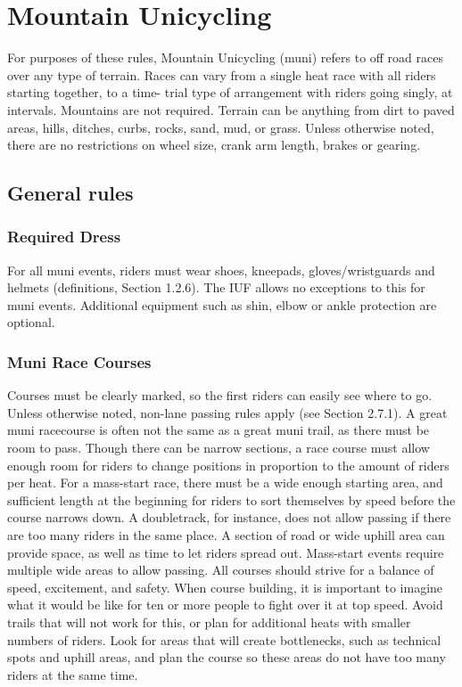 \chapter{Mountain Unicycling}

For purposes of these rules, Mountain Unicycling (muni) refers to off road races
over any type of terrain. Races can vary from a single heat race with all riders
starting together, to a time- trial type of arrangement with riders going
singly, at intervals. Mountains are not required. Terrain can be anything from
dirt to paved areas, hills, ditches, curbs, rocks, sand, mud, or grass. Unless
otherwise noted, there are no restrictions on wheel size, crank arm length,
brakes or gearing.


\section{General rules}


\subsection{Required Dress}
For all muni events, riders must wear shoes, kneepads, gloves/wristguards and
helmets (definitions, Section 1.2.6). %
The IUF allows no exceptions to this for muni events. Additional equipment such
as shin, elbow or ankle protection are optional.

\subsection{Muni Race Courses}
Courses must be clearly marked, so the first riders can easily see where to go.
Unless otherwise noted, non-lane passing rules apply (see Section 2.7.1).
A great muni racecourse is often not the same as a great muni
trail, as there must be room to pass. Though there can be narrow sections, a
race course must allow enough room for riders to change positions in proportion
to the amount of riders per heat. For a mass-start race, there must be a wide
enough starting area, and sufficient length at the beginning for riders to sort
themselves by speed before the course narrows down. A doubletrack, for instance,
does not allow passing if there are too many riders in the same place. A section
of road or wide uphill area can provide space, as well as time to let riders
spread out. Mass-start events require multiple wide areas to allow passing. All
courses should strive for a balance of speed, excitement, and safety. When
course building, it is important to imagine what it would be like for ten or
more people to fight over it at top speed. Avoid trails that will not work for
this, or plan for additional heats with smaller numbers of riders. Look for
areas that will create bottlenecks, such as technical spots and uphill areas,
and plan the course so these areas do not have too many riders at the same time.

